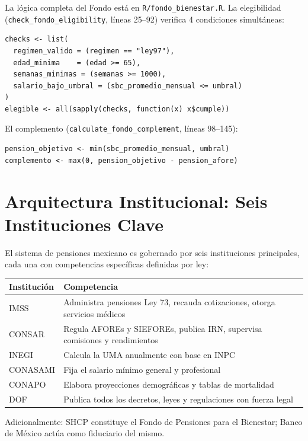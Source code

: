 \documentclass[11pt,a4paper]{report}
\begin{document}
\begin{tcolorbox}[colback=orange!5!white, colframe=orange!75!black, title=\textbf{Aplicaci\'on en C\'odigo}]
La l\'ogica completa del Fondo est\'a en \texttt{R/fondo\_bienestar.R}. La elegibilidad (\texttt{check\_fondo\_eligibility}, l\'ineas 25--92) verifica 4 condiciones simult\'aneas:

\begin{lstlisting}
checks <- list(
  regimen_valido = (regimen == "ley97"),
  edad_minima    = (edad >= 65),
  semanas_minimas = (semanas >= 1000),
  salario_bajo_umbral = (sbc_promedio_mensual <= umbral)
)
elegible <- all(sapply(checks, function(x) x$cumple))
\end{lstlisting}

El complemento (\texttt{calculate\_fondo\_complement}, l\'ineas 98--145):
\begin{lstlisting}
pension_objetivo <- min(sbc_promedio_mensual, umbral)
complemento <- max(0, pension_objetivo - pension_afore)
\end{lstlisting}
\end{tcolorbox}

\section{Arquitectura Institucional: Seis Instituciones Clave}

\begin{tcolorbox}[colback=blue!5!white, colframe=blue!75!black, title=\textbf{Definici\'on Formal}]
El sistema de pensiones mexicano es gobernado por seis instituciones principales, cada una con competencias espec\'ificas definidas por ley:

\begin{center}
\begin{tabularx}{\textwidth}{lX}
\toprule
\textbf{Instituci\'on} & \textbf{Competencia} \\
\midrule
IMSS & Administra pensiones Ley 73, recauda cotizaciones, otorga servicios m\'edicos \\
CONSAR & Regula AFOREs y SIEFOREs, publica IRN, supervisa comisiones y rendimientos \\
INEGI & Calcula la UMA anualmente con base en INPC \\
CONASAMI & Fija el salario m\'inimo general y profesional \\
CONAPO & Elabora proyecciones demogr\'aficas y tablas de mortalidad \\
DOF & Publica todos los decretos, leyes y regulaciones con fuerza legal \\
\bottomrule
\end{tabularx}
\end{center}
Adicionalmente: SHCP constituye el Fondo de Pensiones para el Bienestar; Banco de M\'exico act\'ua como fiduciario del mismo.
\end{tcolorbox}
\end{document}
